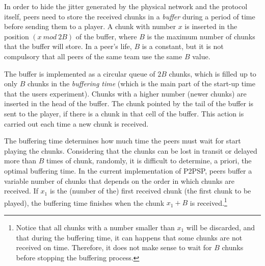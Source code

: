 
\label{sec:buffering_chunks}

In order to hide the jitter generated by the physical network and the
protocol itself, peers need to store the received chunks in a
\emph{buffer} during a period of time before sending them to a
player. A chunk with number $x$ is inserted in the position
$(x~\mathit{mod}~2B)$ of the buffer, where $B$ is the maximum number
of chunks that the buffer will store. In a peer's life, $B$ is a
constant, but it is not compulsory that all peers of the same team use
the same $B$ value.

The buffer is implemented as a circular queue of $2B$ chunks, which is
filled up to only $B$ chunks in the \emph{buffering time} (which is the main
part of the start-up time that the users experiment). Chunks with a
higher number (newer chunks) are inserted in the head of the
buffer. The chunk pointed by the tail of the buffer is sent to the
player, if there is a chunk in that cell of the buffer. This action
is carried out each time a new chunk is received.

The buffering time determines how much time the peers must wait for
start playing the chunks. Considering that the chunks can be lost in
transit or delayed more than $B$ times of chunk, randomly, it is
difficult to determine, a priori, the optimal buffering time. In the
current implementation of P2PSP, peers buffer a variable number of
chunks that depends on the order in which chunks are received. If
$x_1$ is the (number of the) first received chunk (the first chunk to
be played), the buffering time finishes when the chunk $x_1+B$ is
received.\footnote{Notice that all chunks with a number smaller than
  $x_1$ will be discarded, and that during the buffering time, it can
  happens that some chunks are not received on time. Therefore, it
  does not make sense to wait for $B$ chunks before stopping the
  buffering process.}


\begin{comment}
An heuristic that
works is the described in the Fig.~\ref{fig:DBS_peer_buffering}. As
can be seen, $\text{chunk\_to\_play}$ points to the first received
chunk, that not necessary is the received chunk with lower
index. After that, the
buffering finishes when a chunk with index $\text{chunk\_to\_play} +
\text{BUFFER\_SIZE}/2$ has been received.\footnote{This not means that
  $\text{BUFFER\_SIZE}/2$ chunks are available in the buffer.}
\end{comment}
